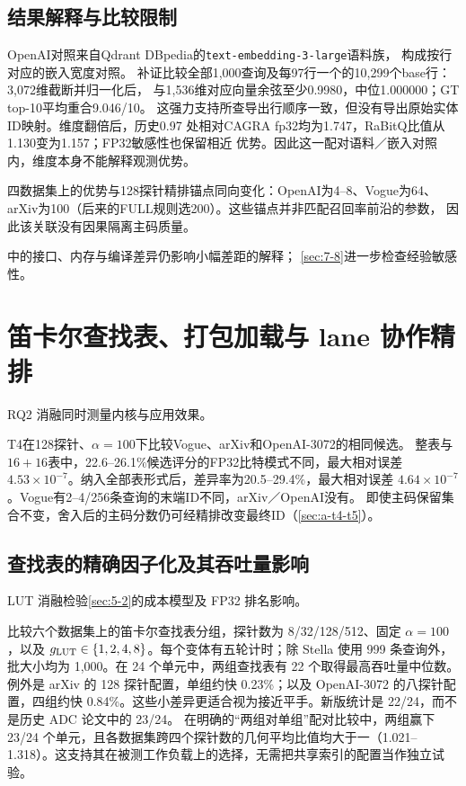 

\subsection{结果解释与比较限制}

OpenAI对照来自Qdrant DBpedia的\texttt{text-embedding-3-large}语料族，
构成按行对应的嵌入宽度对照\cite{data_openai1536,data_openai3072}。
补证比较全部1,000查询及每97行一个的10,299个base行：3,072维截断并归一化后，
与1,536维对应向量余弦至少0.9980，中位1.000000；GT top-10平均重合9.046/10。
这强力支持所查导出行顺序一致，但没有导出原始实体ID映射。维度翻倍后，历史0.97
处相对CAGRA fp32均为1.747，RaBitQ比值从1.130变为1.157；FP32敏感性也保留相近
优势。因此这一配对语料／嵌入对照内，维度本身不能解释观测优势。

四数据集上的优势与128探针精排锚点同向变化：OpenAI为4--8、Vogue为64、
arXiv为100（后来的FULL规则选200）。这些锚点并非匹配召回率前沿的参数，
因此该关联没有因果隔离主码质量。

中的接口、内存与编译差异仍影响小幅差距的解释；
\cref{sec:7-8}进一步检查经验敏感性。




\section{笛卡尔查找表、打包加载与 lane 协作精排}
\label{sec:7-3}

RQ2 消融同时测量内核与应用效果。

T4在128探针、$\alpha=100$下比较Vogue、arXiv和OpenAI-3072的相同候选。
整表与$16+16$表中，22.6--26.1\%候选评分的FP32比特模式不同，最大相对误差
$4.53\times10^{-7}$。纳入全部表形式后，差异率为20.5--29.4\%，最大相对误差
$4.64\times10^{-7}$。Vogue有2--4/256条查询的末端ID不同，arXiv／OpenAI没有。
即使主码保留集合不变，舍入后的主码分数仍可经精排改变最终ID（\cref{sec:a-t4-t5}）。


\subsection{查找表的精确因子化及其吞吐量影响}

LUT 消融检验\cref{sec:5-2}的成本模型及 FP32 排名影响。


 比较六个数据集上的笛卡尔查找表分组，探针数为 8/32/128/512、固定 $\alpha=100$，以及 $g_{\mathrm{LUT}}\in\{1,2,4,8\}$。每个变体有五轮计时；除 Stella 使用 999 条查询外，批大小均为 1,000。在 24 个单元中，两组查找表有 22 个取得最高吞吐量中位数。例外是 arXiv 的 128 探针配置，单组约快 0.23\%；以及 OpenAI-3072 的八探针配置，四组约快 0.84\%。这些小差异更适合视为接近平手。新版统计是 22/24，而不是历史 ADC 论文中的 23/24。
在明确的“两组对单组”配对比较中，两组赢下 23/24 个单元，且各数据集跨四个探针数的几何平均比值均大于一（1.021--1.318）。这支持其在被测工作负载上的选择，无需把共享索引的配置当作独立试验。

